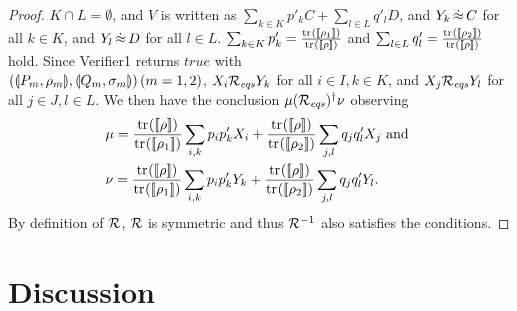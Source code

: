\begin{proof}
$K \cap L = \emptyset$, and
$V$ is written as $\sum_{k \in K}p'_k C + \sum_{l \in L}q'_l D$, and
$Y_k \,\dot\approx\, C$ for all $k \in K$, and
$Y_l \,\dot\approx\, D$ for all $l \in L$. 
$\sum_{k \in K} p'_k = \frac{{\rm tr}_{}([\![\rho_1]\!])}{{\rm tr}_{}([\![\rho]\!])}$
 and
$\sum_{l \in L} q'_l =
\frac{{\rm tr}_{}([\![\rho_2]\!])}{{\rm tr}_{}([\![\rho]\!])}$ hold.
Since Verifier1 returns $\mathit{true}$ with \\
$(\llparenthesis P_m, \rho_m \rrparenthesis, \llparenthesis Q_m, \sigma_m \rrparenthesis)\,(m = 1,2)$,
$X_i \mathcal{R}_{\mathit{eqs}} Y_k$ for all $i \in I, k \in K$, and
$X_j \mathcal{R}_{\mathit{eqs}} Y_l$ for all $j \in J, l \in L$.
We then have the conclusion $\mu (\mathcal{R}_{\mathit{eqs}})^\dagger \nu$
observing 
\begin{align*}
 &\mu = \frac{\tr{}{\braw{\rho}}}{\tr{}{\braw{\rho_1}}}
         \sum_{i,k}p_i p'_k X_i +
        \frac{\tr{}{\braw{\rho}}}{\tr{}{\braw{\rho_2}}}
         \sum_{j,l}q_j q'_l X_j \mbox{ and }\\
 &\nu = \frac{\tr{}{\braw{\rho}}}{\tr{}{\braw{\rho_1}}}
         \sum_{i,k}p_i p'_k Y_k +
        \frac{\tr{}{\braw{\rho}}}{\tr{}{\braw{\rho_2}}}
         \sum_{j,l}q_j q'_l Y_l.
\end{align*}
By definition of $\mathcal{R}$, $\mathcal{R}$ is symmetric and thus $\mathcal{R}^{-1}$ also
satisfies the conditions.
\end{proof}

\section{Discussion}
